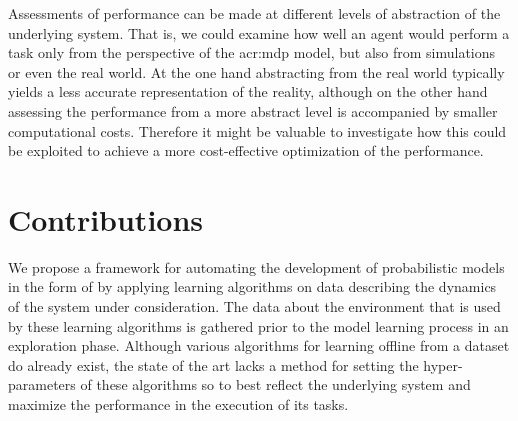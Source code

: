 Assessments of performance can be made at different levels of abstraction of the underlying system.
That is, we could examine how well an agent would perform a task only from the perspective of the \acrshort{acr:mdp} model, but also
from simulations or even the real world.
At the one hand abstracting from the real world typically yields a less accurate representation of the reality, although on the other hand assessing the performance from a more abstract level is accompanied by smaller computational costs.
Therefore it might be valuable to investigate how this could be exploited to achieve a more cost-effective optimization of the performance.


\section{Contributions}
\label{sec:contribution}

We propose a framework for automating the development of probabilistic models in the form of  by applying learning algorithms on data describing the dynamics of the system under consideration.
The data about the environment that is used by these learning algorithms is gathered prior to the model learning process in an exploration phase.
Although various algorithms for learning  offline from a dataset \cite{shatkay1997learning, welch2003hidden, nikovski2002state} do already exist, the state of the art lacks a method for setting the hyper-parameters of these algorithms so to best reflect the underlying system and maximize the performance in the execution of its tasks.

